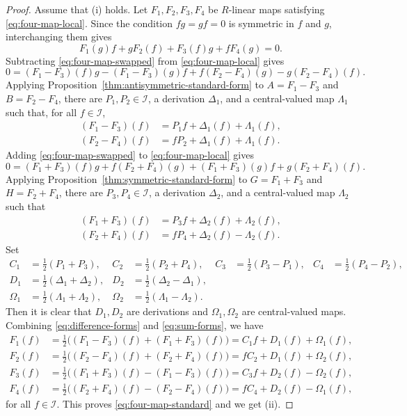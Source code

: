 \documentclass[reqno]{amsart}
\numberwithin{equation}{section}
\theoremstyle{plain}
\theoremstyle{definition}
\newcommand{\I}{\mathcal I}
\begin{document}
\begin{proof}
Assume that (i) holds. Let $F_1,F_2,F_3,F_4$ be $R$-linear maps satisfying
\eqref{eq:four-map-local}. Since the condition $fg=gf=0$ is
symmetric in $f$ and $g$, interchanging them gives
\begin{equation}\label{eq:four-map-swapped}
F_1(g)f+gF_2(f)+F_3(f)g+fF_4(g)=0.
\end{equation}
Subtracting \eqref{eq:four-map-swapped} from \eqref{eq:four-map-local} gives
$$0=(F_1-F_3)(f)g-(F_1-F_3)(g)f+f(F_2-F_4)(g)-g(F_2-F_4)(f).$$
Applying Proposition~\ref{thm:antisymmetric-standard-form} to
$A=F_1-F_3$ and $B=F_2-F_4$, there are $P_1,P_2\in\I$, a derivation $\Delta_1$, and a
central-valued map $\Lambda_1$ such that, for all $f\in\I$,
\begin{equation}\label{eq:difference-forms}
\begin{aligned}
(F_1-F_3)(f)&=P_1f+\Delta_1(f)+\Lambda_1(f),\\
(F_2-F_4)(f)&=fP_2+\Delta_1(f)+\Lambda_1(f).
\end{aligned}
\end{equation}
Adding \eqref{eq:four-map-swapped} to \eqref{eq:four-map-local} gives
$$0=(F_1+F_3)(f)g+f(F_2+F_4)(g)+(F_1+F_3)(g)f+g(F_2+F_4)(f).$$
Applying Proposition~\ref{thm:symmetric-standard-form} to
$G=F_1+F_3$ and $H=F_2+F_4$, there are $P_3,P_4\in\I$, a derivation $\Delta_2$, and a
central-valued map $\Lambda_2$ such that
\begin{equation}\label{eq:sum-forms}
\begin{aligned}
(F_1+F_3)(f)&=P_3f+\Delta_2(f)+\Lambda_2(f),\\
(F_2+F_4)(f)&=fP_4+\Delta_2(f)-\Lambda_2(f).
\end{aligned}
\end{equation}
Set
\[
\begin{aligned}
C_1&=\tfrac12(P_1+P_3),&
C_2&=\tfrac12(P_2+P_4),&
C_3&=\tfrac12(P_3-P_1),&
C_4&=\tfrac12(P_4-P_2),\\
D_1&=\tfrac12(\Delta_1+\Delta_2),&
D_2&=\tfrac12(\Delta_2-\Delta_1),\\
\Omega_1&=\tfrac12(\Lambda_1+\Lambda_2),&
\Omega_2&=\tfrac12(\Lambda_1-\Lambda_2).
\end{aligned}
\]
Then it is clear that $D_1,D_2$ are derivations and $\Omega_1,\Omega_2$ are central-valued maps.
Combining \eqref{eq:difference-forms} and \eqref{eq:sum-forms}, we have
\[
\begin{aligned}
F_1(f)
&=\frac12\bigl((F_1-F_3)(f)+(F_1+F_3)(f)\bigr)=C_1f+D_1(f)+\Omega_1(f),\\
F_2(f)
&=\frac12\bigl((F_2-F_4)(f)+(F_2+F_4)(f)\bigr)=fC_2+D_1(f)+\Omega_2(f),\\
F_3(f)
&=\frac12\bigl((F_1+F_3)(f)-(F_1-F_3)(f)\bigr)=C_3f+D_2(f)-\Omega_2(f),\\
F_4(f)
&=\frac12\bigl((F_2+F_4)(f)-(F_2-F_4)(f)\bigr)=fC_4+D_2(f)-\Omega_1(f),
\end{aligned}
\]
for all $f\in\I$. This proves \eqref{eq:four-map-standard} and we get (ii).


\end{proof}
\end{document}

